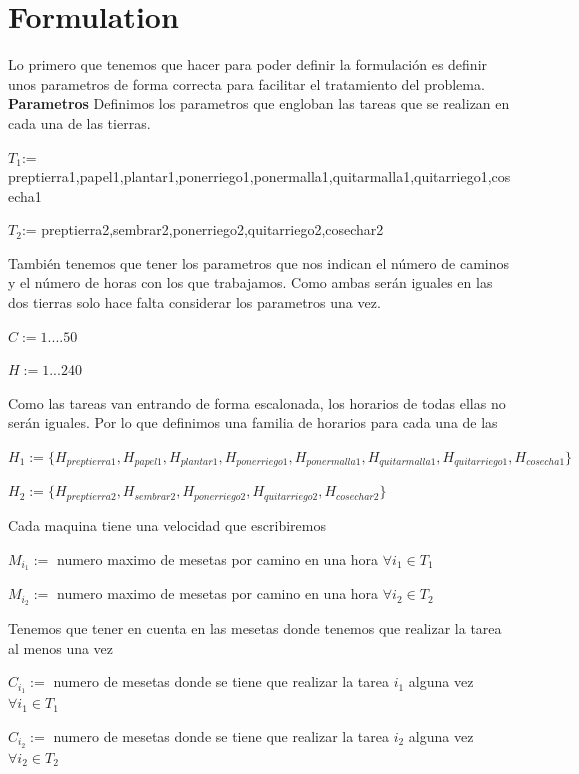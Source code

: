 \chapter*{Formulation}
Lo primero que tenemos que hacer para poder definir la formulación es definir unos parametros de forma correcta para facilitar el 
tratamiento del problema.
\textbf{Parametros}
Definimos los parametros que engloban las tareas que se realizan en cada una de las tierras. 

$T_1$:= {preptierra1,papel1,plantar1,ponerriego1,ponermalla1,quitarmalla1,quitarriego1,cosecha1}

$T_2$:= {preptierra2,sembrar2,ponerriego2,quitarriego2,cosechar2}

También tenemos que tener los parametros que nos indican el número de caminos y el número de horas con los que trabajamos. Como ambas
serán iguales en las dos tierras solo hace falta considerar los parametros una vez. 
\begin{center}

$C:={1....50}$

$H:={1...240}$ 
\end{center}
Como las tareas van entrando de forma escalonada, los horarios de todas ellas no serán iguales. Por lo que definimos una familia de 
horarios para cada una de las 
\begin{center}
$H_1 := \{H_{preptierra1},H_{papel1},H_{plantar1},H_{ponerriego1},H_{ponermalla1},H_{quitarmalla1},H_{quitarriego1},H_{cosecha1}\}$

$H_2:= \{H_{preptierra2},H_{sembrar2},H_{ponerriego2},H_{quitarriego2},H_{cosechar2}\}$
\end{center}    

Cada maquina tiene una velocidad que escribiremos
\begin{center}
$M_{i_1}:=$ numero maximo de mesetas por camino en una hora $\forall i_1 \in T_1$

$M_{i_2}:=$ numero maximo de mesetas por camino en una hora $\forall i_2 \in T_2$
\end{center}

Tenemos que tener en cuenta en las mesetas donde tenemos que realizar la tarea al menos una vez

\begin{center}
    $C_{i_1}:=$ numero de mesetas donde se tiene que realizar la tarea $i_1$ alguna vez $\forall i_1 \in T_1$

     $C_{i_2}:=$ numero de mesetas donde se tiene que realizar la tarea $i_2$ alguna vez $\forall i_2 \in T_2$
\end{center}

